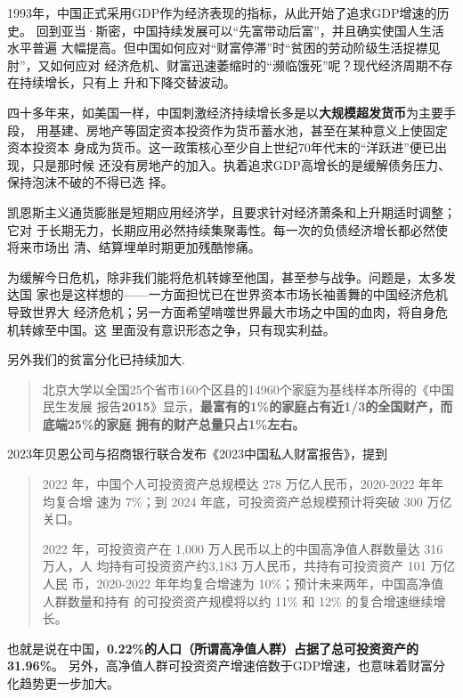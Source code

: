 1993年，中国正式采用GDP作为经济表现的指标，从此开始了追求GDP增速的历史。
回到亚当·斯密，中国持续发展可以“先富带动后富”，并且确实使国人生活水平普遍
大幅提高。但中国如何应对“财富停滞”时“贫困的劳动阶级生活捉襟见肘”，又如何应对
经济危机、财富迅速萎缩时的“濒临饿死”呢？现代经济周期不存在持续增长，只有上
升和下降交替波动。

四十多年来，如美国一样，中国刺激经济持续增长多是以\textbf{大规模超发货币}为主要手段，
用基建、房地产等固定资本投资作为货币蓄水池，甚至在某种意义上使固定资本投资本
身成为货币。这一政策核心至少自上世纪70年代末的“洋跃进”便已出现，只是那时候
还没有房地产的加入。执着追求GDP高增长的是缓解债务压力、保持泡沫不破的不得已选
择。

凯恩斯主义通货膨胀是短期应用经济学，且要求针对经济萧条和上升期适时调整；它对
于长期无力，长期应用必然持续集聚毒性。每一次的负债经济增长都必然使将来市场出
清、结算埋单时期更加残酷惨痛。

为缓解今日危机，除非我们能将危机转嫁至他国，甚至参与战争。问题是，太多发达国
家也是这样想的——一方面担忧已在世界资本市场长袖善舞的中国经济危机导致世界大
经济危机；另一方面希望啃噬世界最大市场之中国的血肉，将自身危机转嫁至中国。这
里面没有意识形态之争，只有现实利益。

另外我们的贫富分化已持续加大.
\begin{quotation}
  北京大学以全国25个省市160个区县的14960个家庭为基线样本所得的《中国民生发展
  报告\textbf{2015}》显示，\textbf{最富有的1\%的家庭占有近1/3的全国财产，而底端25\%的家庭
    拥有的财产总量只占1\%左右。}\cite{dajueqi}
\end{quotation}

2023年贝恩公司与招商银行联合发布《2023中国私人财富报告》，提到
\begin{quotation}
  2022 年，中国个人可投资资产总规模达 278 万亿人民币，2020-2022 年年均复合增
  速为 7\%；到 2024 年底，可投资资产总规模预计将突破 300 万亿关口。

  2022 年，可投资资产在 1,000 万人民币以上的中国高净值人群数量达 316 万人，人
  均持有可投资资产约3,183 万人民币，共持有可投资资产 101 万亿人民
  币，2020-2022 年年均复合增速为 10\%；预计未来两年，中国高净值人群数量和持有
  的可投资资产规模将以约 11\% 和 12\% 的复合增速继续增长。
\end{quotation}
也就是说在中国，\textbf{0.22\%的人口（所谓高净值人群）占据了总可投资资产的31.96\%}。
另外，高净值人群可投资资产增速倍数于GDP增速，也意味着财富分化趋势更一步加大。


